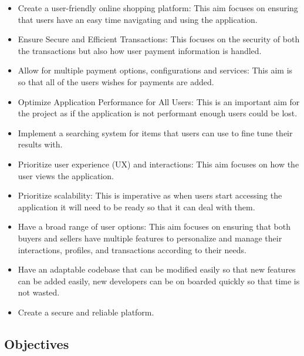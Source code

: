\documentclass[]{project_report}
\begin{document}
\begin{itemize}
    \item Create a user-friendly online shopping platform: This aim focuses on ensuring that users have an easy time navigating and using the application.
    \item Ensure Secure and Efficient Transactions: This focuses on the security of both the transactions but also how user payment information is handled.
    \item Allow for multiple payment options, configurations and services: This aim is so that all of the users wishes for payments are added.
    \item Optimize Application Performance for All Users: This is an important aim for the project as if the application is not performant enough users could be lost.
    \item Implement a searching system for items that users can use to fine tune their results with.
    \item Prioritize user experience (UX) and interactions: This aim focuses on how the user views the application.
    \item Prioritize scalability: This is imperative as when users start accessing the application it will need to be ready so that it can deal with them.
    \item Have a broad range of user options: This aim focuses on ensuring that both buyers and sellers have multiple features to personalize and manage their interactions, profiles, and transactions according to their needs.
    \item  Have an adaptable codebase that can be modified easily so that new features can be added easily, new developers can be on boarded quickly so that time is not wasted.
    \item Create a secure and reliable platform.
\end{itemize}

\subsection{Objectives}
\end{document}
